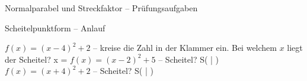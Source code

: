 \begin{aufgabe}{Normalparabel und Streckfaktor – Prüfungsaufgaben}
\begin{teile}
\begin{ksys}[xmin=0,xmax=3,ymin=0,ymax=25,xstep=0.5,ystep=5,xlabel=$t$ in s,ylabel=$h$ in m,ablesen]
\end{ksys}
\end{teile}
\end{aufgabe}

\begin{aufgabe}{Scheitelpunktform – Anlauf}
\begin{teile}
\teil $f(x) = (x - 4)^2 + 2$ – kreise die Zahl in der Klammer ein. Bei welchem $x$ liegt der Scheitel? x = \leerfeld
\teil $f(x) = (x - 2)^2 + 5$ – Scheitel? S( \leerfeld | \leerfeld )
\teil $f(x) = (x + 4)^2 + 2$ – Scheitel? S( \leerfeld | \leerfeld )
\end{teile}
\end{aufgabe}

